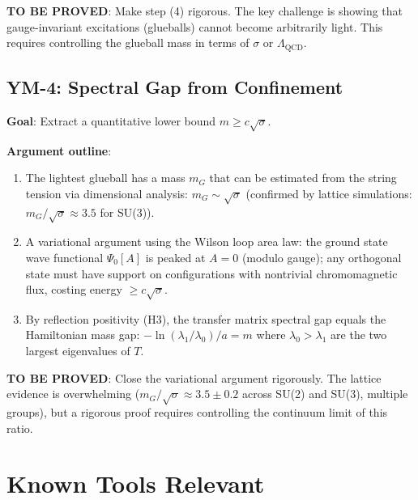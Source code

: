 \documentclass[11pt]{article}
\theoremstyle{definition}
\begin{document}
\textbf{TO BE PROVED}: Make step (4) rigorous.  The key challenge is showing that
gauge-invariant excitations (glueballs) cannot become arbitrarily light.
This requires controlling the glueball mass in terms of $\sigma$ or $\Lambda_{\mathrm{QCD}}$.

\subsection{YM-4: Spectral Gap from Confinement}

\textbf{Goal}: Extract a quantitative lower bound $m \geq c\sqrt{\sigma}$.

\textbf{Argument outline}:
\begin{enumerate}
  \item The lightest glueball has a mass $m_G$ that can be estimated from the
    string tension via dimensional analysis: $m_G \sim \sqrt{\sigma}$
    (confirmed by lattice simulations: $m_G / \sqrt{\sigma} \approx 3.5$ for SU(3)).
  \item A variational argument using the Wilson loop area law:
    the ground state wave functional $\Psi_0[A]$ is peaked at $A = 0$ (modulo gauge);
    any orthogonal state must have support on configurations with nontrivial
    chromomagnetic flux, costing energy $\geq c\sqrt{\sigma}$.
  \item By reflection positivity (H3), the transfer matrix spectral gap equals the
    Hamiltonian mass gap: $-\ln(\lambda_1 / \lambda_0) / a = m$ where $\lambda_0 > \lambda_1$
    are the two largest eigenvalues of $T$.
\end{enumerate}

\textbf{TO BE PROVED}: Close the variational argument rigorously.
The lattice evidence is overwhelming ($m_G / \sqrt{\sigma} \approx 3.5 \pm 0.2$ across
SU(2) and SU(3), multiple groups), but a rigorous proof requires controlling
the continuum limit of this ratio.

\section{Known Tools Relevant}
\end{document}
